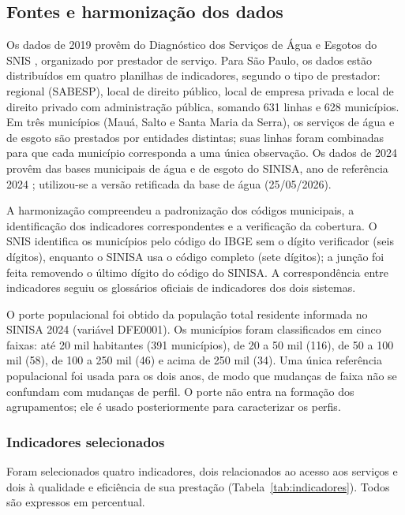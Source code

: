 \documentclass[12pt]{article}
\begin{document}
\subsection{Fontes e harmonização dos dados}

Os dados de 2019 provêm do Diagnóstico dos Serviços de Água e Esgotos do SNIS
\cite{snis2019ae}, organizado por prestador de serviço. Para São Paulo, os dados estão distribuídos
em quatro planilhas de indicadores, segundo o tipo de prestador: regional (SABESP), local de direito
público, local de empresa privada e local de direito privado com administração pública, somando 631
linhas e 628 municípios. Em três municípios (Mauá, Salto e Santa Maria da Serra), os serviços de
água e de esgoto são prestados por entidades distintas; suas linhas foram combinadas para que cada
município corresponda a uma única observação. Os dados de 2024 provêm das bases municipais de água e
de esgoto do SINISA, ano de referência 2024 \cite{sinisa2025}; utilizou-se a versão retificada da
base de água (25/05/2026).

A harmonização compreendeu a padronização dos códigos municipais, a identificação dos indicadores
correspondentes e a verificação da cobertura. O SNIS identifica os municípios pelo código do IBGE sem
o dígito verificador (seis dígitos), enquanto o SINISA usa o código completo (sete dígitos); a junção
foi feita removendo o último dígito do código do SINISA. A correspondência entre indicadores seguiu
os glossários oficiais de indicadores dos dois sistemas.

O porte populacional foi obtido da população total residente informada no SINISA 2024 (variável
DFE0001). Os municípios foram classificados em cinco faixas: até 20 mil habitantes (391 municípios),
de 20 a 50 mil (116), de 50 a 100 mil (58), de 100 a 250 mil (46) e acima de 250 mil (34). Uma única
referência populacional foi usada para os dois anos, de modo que mudanças de faixa não se confundam
com mudanças de perfil. O porte não entra na formação dos agrupamentos; ele é usado posteriormente
para caracterizar os perfis.

\subsubsection{Indicadores selecionados}
\label{sec:indicadores}

Foram selecionados quatro indicadores, dois relacionados ao acesso aos serviços e dois à qualidade e
eficiência de sua prestação (Tabela~\ref{tab:indicadores}). Todos são expressos em percentual.
\end{document}
